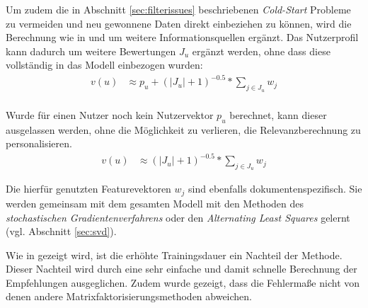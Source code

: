 Um zudem die in Abschnitt \ref{sec:filterissues} beschriebenen \textit{Cold-Start} Probleme zu vermeiden und neu gewonnene Daten direkt einbeziehen zu können, wird die Berechnung wie in \citep{Paterek07} und \citep{Koren:2009:MFT:1608565.1608614} um weitere Informationsquellen ergänzt. Das Nutzerprofil kann dadurch um weitere Bewertungen $J_u$ ergänzt werden, ohne dass diese vollständig in das Modell einbezogen wurden:
\begin{align}
v(u) & \approx p_u  +(|J_u|+1)^{-0.5}*\sum_{j \in J_u} w_{j} \label{form:anonuser} \\
\end{align}

Wurde für einen Nutzer noch kein Nutzervektor $p_u$ berechnet, kann dieser ausgelassen werden, ohne die Möglichkeit zu verlieren, die Relevanzberechnung zu personalisieren.
\begin{align}
v(u) & \approx (|J_u|+1)^{-0.5}*\sum_{j \in J_u} w_{j} \label{form:anonuser}
\end{align}

Die hierfür genutzten Featurevektoren $w_j$ sind ebenfalls dokumentenspezifisch. Sie werden gemeinsam mit dem gesamten Modell mit den Methoden des \textit{stochastischen Gradientenverfahrens} oder den \textit{Alternating Least Squares} gelernt (vgl. Abschnitt \ref{sec:svd}).  \citep{Paterek07,Koren:2009:MFT:1608565.1608614}

Wie in \citep{Cacheda2011} gezeigt wird, ist die erhöhte Trainingsdauer ein Nachteil der Methode. Dieser Nachteil wird durch eine sehr einfache und damit schnelle Berechnung der Empfehlungen ausgeglichen. Zudem wurde gezeigt, dass die Fehlermaße nicht von denen andere Matrixfaktorisierungsmethoden abweichen. \citep{Cacheda2011}
 \newpage
